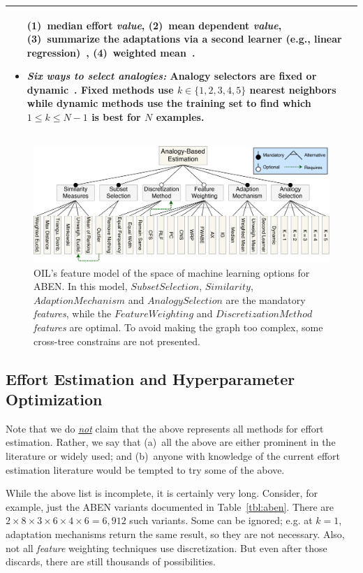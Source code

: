 \documentclass[10pt,conference]{IEEEtran}
\begin{document}
\begin{table}[!t]
\begin{tabular}{|p{.94\linewidth}|}
\begin{itemize}[leftmargin=0.1in]
(1)~median effort {\em value},
(2)~mean dependent {\em value},
(3)~summarize the adaptations via a second learner (e.g., linear regression)~\cite{li2009study,menzies2006selecting,baker2007hybrid,quinlan1992learning},
(4)~weighted mean~\cite{mendes2003comparative}.
\item
{\em Six ways to select analogies:}
Analogy selectors  are  fixed or dynamic~\cite{teak2012}. Fixed methods use $k\in\{1,2,3,4,5\}$
nearest neighbors
while  dynamic methods use the training set to find which $1 \le k \le N-1$ is best for   $N$ examples.
\end{itemize}
\\\hline
\end{tabular}
\end{table}

\begin{figure}[!t]
\centerline{\includegraphics[width=.7\textwidth]{FTM.pdf}}
\caption{OIL's feature model of the space of machine learning options for ABEN.  In this model, $\mathit{Subset Selection}$, $\mathit{Similarity}$, $\mathit{Adaption Mechanism}$ and $\mathit{Analogy Selection}$ are the mandatory {\em features}, while the $\mathit{Feature Weighting}$ and $\mathit{Discretization Method}$ {\em features} are optimal. To avoid making the graph too complex, some cross-tree constrains are not presented.}    
\label{fig:featuretree}
\end{figure}


\subsection{Effort Estimation and  Hyperparameter Optimization}\label{sbse}


Note that we do \underline{{\em not}} claim that the above represents all methods for  effort estimation. Rather, we  say that (a)~all the above are either prominent in the literature or widely used; and (b)~anyone  with knowledge of  the current effort estimation 
literature would be tempted to try some of the above.

While the above list is incomplete, it is certainly very long. Consider, for example, just the ABEN
variants documented in Table~\ref{tbl:aben}. There are 
$2\times 8\times 3\times 6\times 4\times 6=6,912$ such variants.  Some   can be ignored;
e.g. at $k=1$,     adaptation mechanisms return the same result, so they are not necessary. Also, not all  {\em feature} weighting techniques use discretization. But even after those discards, there are still thousands of possibilities. 
\end{document}
